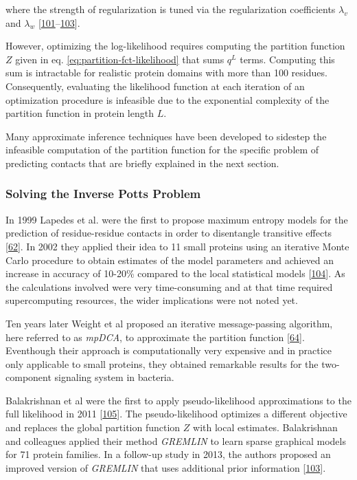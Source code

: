 \documentclass[11pt,a4paper,twoside]{book}
\theoremstyle{definition}
\theoremstyle{definition}
\theoremstyle{remark}
\begin{document}
where the strength of regularization is tuned via the regularization
coefficients \(\lambda_v\) and \(\lambda_w\)
{[}\protect\hyperlink{ref-Seemayer2014}{101}--\protect\hyperlink{ref-Kamisetty2013}{103}{]}.

However, optimizing the log-likelihood requires computing the partition
function \(Z\) given in eq. \eqref{eq:partition-fct-likelihood} that sums
\(q^L\) terms. Computing this sum is intractable for realistic protein
domains with more than 100 residues. Consequently, evaluating the
likelihood function at each iteration of an optimization procedure is
infeasible due to the exponential complexity of the partition function
in protein length \(L\).

Many approximate inference techniques have been developed to sidestep
the infeasible computation of the partition function for the specific
problem of predicting contacts that are briefly explained in the next
section.

\subsubsection{Solving the Inverse Potts
Problem}\label{potts-model-solutions}

In 1999 Lapedes et al. were the first to propose maximum entropy models
for the prediction of residue-residue contacts in order to disentangle
transitive effects {[}\protect\hyperlink{ref-Lapedes1999}{62}{]}. In
2002 they applied their idea to 11 small proteins using an iterative
Monte Carlo procedure to obtain estimates of the model parameters and
achieved an increase in accuracy of 10-20\% compared to the local
statistical models {[}\protect\hyperlink{ref-Lapedes2012a}{104}{]}. As
the calculations involved were very time-consuming and at that time
required supercomputing resources, the wider implications were not noted
yet.

Ten years later Weight et al proposed an iterative message-passing
algorithm, here referred to as \emph{mpDCA}, to approximate the
partition function {[}\protect\hyperlink{ref-Weigt2009}{64}{]}.
Eventhough their approach is computationally very expensive and in
practice only applicable to small proteins, they obtained remarkable
results for the two-component signaling system in bacteria.

Balakrishnan et al were the first to apply pseudo-likelihood
approximations to the full likelihood in 2011
{[}\protect\hyperlink{ref-Balakrishnan2011}{105}{]}. The
pseudo-likelihood optimizes a different objective and replaces the
global partition function \(Z\) with local estimates. Balakrishnan and
colleagues applied their method \emph{GREMLIN} to learn sparse graphical
models for 71 protein families. In a follow-up study in 2013, the
authors proposed an improved version of \emph{GREMLIN} that uses
additional prior information
{[}\protect\hyperlink{ref-Kamisetty2013}{103}{]}.
\end{document}
